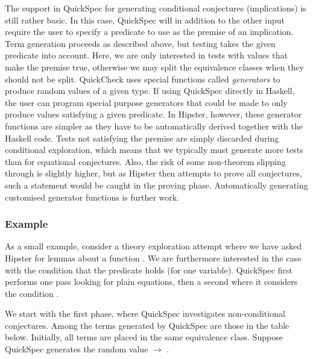 The support in QuickSpec for generating conditional conjectures (implications) is still rather basic.
%
In this case, QuickSpec will in addition to the other input require the user to specify a predicate to use as the premise of an implication.
%
Term generation proceeds as described above, but testing takes the given predicate into account.
%
Here, we are only interested in tests with values that make the premise true, otherwise we may split the equivalence classes when they should not be split.
%
QuickCheck uses special functions called \emph{generators} to produce random values of a given type.
%
If using QuickSpec directly in Haskell, the user can program special purpose generators that could be made to only produce values satisfying a given predicate.
%
In Hipster, however, these generator functions are simpler as they have to be automatically derived together with the Haskell code.
%
Tests not satisfying the premise are simply discarded during conditional exploration, which means that we typically must generate more tests than for equational conjectures.
%
Also, the risk of some non-theorem slipping through is slightly higher, but as Hipster then attempts to prove all conjectures, such a statement would be caught in the proving phase.
%
Automatically generating customised generator functions is further work. 

\subsubsection*{Example}
As a small example, consider a theory exploration attempt where we have asked Hipster for lemmas about a function .
%
We are furthermore interested in the case with the condition that the predicate  holds (for one variable).
%
QuickSpec first performs one pass looking for plain equations, then a second where it considers the condition . 

We start with the first phase, where QuickSpec investigates non-conditional conjectures.
%
Among the terms generated by QuickSpec are those in the table below.
%
Initially, all terms are placed in the same equivalence class.
%
Suppose QuickSpec generates the random value  $\rightarrow$ \isaCode{[3,1]}.     

